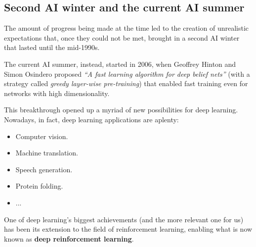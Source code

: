 \subsection{Second AI winter and the current AI summer}
The amount of progress being made at the time led to the creation of unrealistic expectations that, once they could not be met, brought in a second AI winter that lasted until the mid-1990s.

The current AI summer, instead, started in 2006, when Geoffrey Hinton and Simon Osindero proposed \textit{``A fast learning algorithm for deep belief nets''}  \cite{10.1162/neco.2006.18.7.1527} (with a strategy called \textit{greedy layer-wise pre-training}) that enabled fast training even for networks with high dimensionality.

This breakthrough opened up a myriad of new possibilities for deep learning. Nowadays, in fact, deep learning applications are aplenty: 

\begin{itemize}
    \item Computer vision.
    \item Machine translation.
    \item Speech generation.
    \item Protein folding.
    \item ...
\end{itemize}

One of deep learning's biggest achievements (and the more relevant one for us) has been its extension to the field of reinforcement learning, enabling what is now known as \textbf{deep reinforcement learning}.